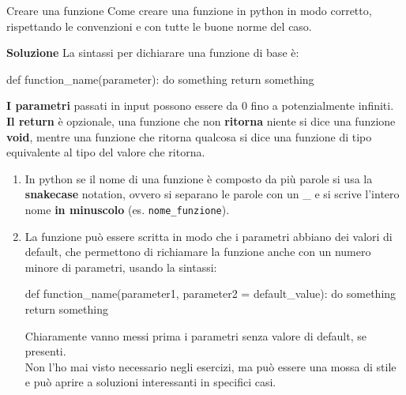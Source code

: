 \documentclass[10pt]{extarticle}
\makeatletter
\newcommand{\<}{\langle}
\renewcommand{\>}{\rangle}
\renewenvironment{proof}[1][\proofname] {\par\pushQED{\qed}
\renewcommand*{\proofname}{Soluzione}
{\normalfont\sffamily\bfseries\topsep6\p@\@plus6\p@\relax #1\@addpunct{.} }}{\popQED\endtrivlist\@endpefalse}
\theoremstyle{mystyle}{\newtheorem*{remark}{Nota}}
\theoremstyle{mystyle}{\newtheorem*{remarks}{Note}}
\theoremstyle{mystyle}{\newtheorem*{example}{Esempio}}
\theoremstyle{mystyle}{\newtheorem*{examples}{Esempi}}
\theoremstyle{definition}{\newtheorem*{exercise}{Exercise}}
\theoremstyle{warn}
\makeatother
\begin{document}
\begin{definition}{Creare una funzione}{}
Come creare una funzione in python in modo corretto, rispettando le convenzioni e con tutte le buone norme del caso.
\end{definition}
\begin{proof}
La sintassi per dichiarare una funzione di base è:
\begin{python}
def function_name(parameter):
    do something
    return something
\end{python}
\textbf{I parametri} passati in input possono essere da 0 fino a potenzialmente infiniti.\\
\textbf{Il return} è opzionale, una funzione che non \textbf{ritorna} niente si dice una funzione \textbf{void}, mentre una funzione che ritorna qualcosa si dice una funzione di tipo equivalente al tipo del valore che ritorna.\\
\end{proof}
\begin{remarks} \leavevmode
\begin{enumerate}
    \item In python se il nome di una funzione è composto da più parole si usa la \textbf{snakecase} notation, ovvero si separano le parole con un \_ e si scrive l'intero nome \textbf{in minuscolo} (es. \texttt{nome\_funzione}).
    \item La funzione può essere scritta in modo che i parametri abbiano dei valori di default, che permettono di richiamare la funzione anche con un numero minore di parametri, usando la sintassi:
\begin{python}
def function_name(parameter1, parameter2 = default_value):
    do something
    return something
\end{python}
    Chiaramente vanno messi prima i parametri senza valore di default, se presenti.\\
    Non l'ho mai visto necessario negli esercizi, ma può essere una mossa di stile e può aprire a soluzioni interessanti in specifici casi.
\end{enumerate}
\end{remarks}
\end{document}
